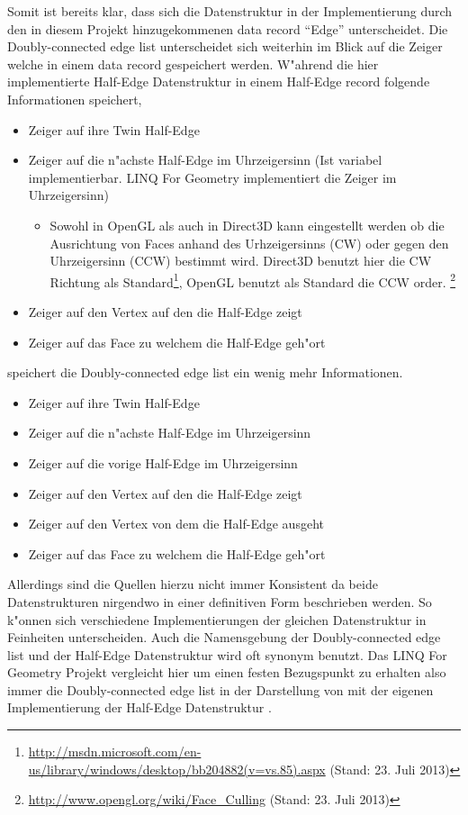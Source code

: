 \documentclass[pagesize, paper=a4, fontsize=12pt,titlepage=true, headings=small, headnosepline, abstractoff, liststotoc, nochapterprefix, plainheadsepline]{scrreprt}
\newcommand{\LFGS}{LINQ For Geometry }
\newcommand{\HES}{Half-Edge Datenstruktur }
\begin{document}
Somit ist bereits klar, dass sich die Datenstruktur in der Implementierung durch den in diesem Projekt hinzugekommenen data record "`Edge"' unterscheidet. Die Doubly-connected edge list unterscheidet sich weiterhin im Blick auf die Zeiger welche in einem data record gespeichert werden. W"ahrend die hier implementierte \HES in einem Half-Edge record folgende Informationen speichert,
\begin{itemize}
\item Zeiger auf ihre Twin Half-Edge
\item Zeiger auf die n"achste Half-Edge im Uhrzeigersinn (Ist variabel implementierbar. \LFGS implementiert die Zeiger im Uhrzeigersinn)
\begin{itemize}
\item Sowohl in OpenGL als auch in Direct3D kann eingestellt werden ob die Ausrichtung von Faces anhand des Urhzeigersinns (CW) oder gegen den Uhrzeigersinn (CCW) bestimmt wird. Direct3D benutzt hier die CW Richtung als Standard\footnote[1]{\url{http://msdn.microsoft.com/en-us/library/windows/desktop/bb204882(v=vs.85).aspx} (Stand: 23. Juli 2013)}, OpenGL benutzt als Standard die CCW order. \footnote[2]{\url{http://www.opengl.org/wiki/Face_Culling} (Stand: 23. Juli 2013)}
\end{itemize}
\item Zeiger auf den Vertex auf den die Half-Edge zeigt
\item Zeiger auf das Face zu welchem die Half-Edge geh"ort
\end{itemize}

speichert die Doubly-connected edge list ein wenig mehr Informationen.
\begin{itemize}
\item Zeiger auf ihre Twin Half-Edge
\item Zeiger auf die n"achste Half-Edge im Uhrzeigersinn
\item Zeiger auf die vorige Half-Edge im Uhrzeigersinn
\item Zeiger auf den Vertex auf den die Half-Edge zeigt
\item Zeiger auf den Vertex von dem die Half-Edge ausgeht
\item Zeiger auf das Face zu welchem die Half-Edge geh"ort
\end{itemize}

Allerdings sind die Quellen hierzu nicht immer Konsistent da beide Datenstrukturen nirgendwo in einer definitiven Form beschrieben werden. So k"onnen sich verschiedene Implementierungen der gleichen Datenstruktur in Feinheiten unterscheiden. Auch die Namensgebung der Doubly-connected edge list und der \HES wird oft synonym benutzt. Das \LFGS Projekt vergleicht hier um einen festen Bezugspunkt zu erhalten also immer die Doubly-connected edge list in der Darstellung von \cite[S.~30 und Folgende]{vanMarkdeBerg.2008} mit der eigenen Implementierung der \HES.
\end{document}
